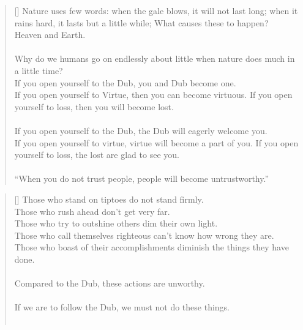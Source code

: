 \documentclass{article}
\begin{document}
\settowidth{\versewidth}{The Wizard leads byemptying people’s minds, filling their bellies, weakening their am- bitions, and making them become strong}
\begin{verse}[\versewidth]
Nature uses few words:
when the gale blows, it will not last long; when it rains hard, it lasts but a little while; What causes these to happen?\\
Heaven and Earth.\\
\hfill\\
Why do we humans go on endlessly about little when nature does much in a little time?\\
If you open yourself to the Dub, you and Dub become one.\\
If you open yourself to Virtue, then you can become virtuous. 
If you open yourself to loss, then you will become lost.\\
\hfill\\
If you open yourself to the Dub, the Dub will eagerly welcome you.\\
If you open yourself to virtue, virtue will become a part of you. 
If you open yourself to loss, the lost are glad to see you.\\
\hfill\\
``When you do not trust people, people will become untrustworthy.''

\end{verse}

\settowidth{\versewidth}{The Wizard leads byemptying people’s minds, filling their bellies, weakening their am- bitions, and making them become strong}
\begin{verse}[\versewidth]
Those who stand on tiptoes do not stand firmly.\\
Those who rush ahead don't get very far.\\
Those who try to outshine others dim their own light.\\
Those who call themselves righteous can't know how wrong they are.\\
Those who boast of their accomplishments diminish the things they have done.\\
\hfill\\
Compared to the Dub, these actions are unworthy.\\
\hfill\\
If we are to follow the Dub, we must not do these things.\\
\hfill\\
\end{verse}
\end{document}
